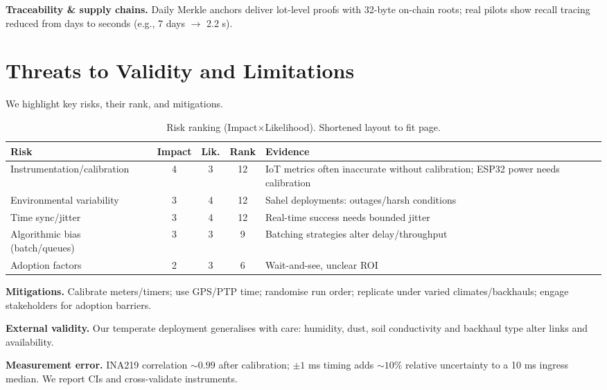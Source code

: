 \documentclass[12pt,onecolumn]{IEEEtran} %
\begin{document}
\textbf{Traceability \& supply chains.} Daily Merkle anchors deliver lot-level proofs with 32-byte on-chain roots; real pilots show recall tracing reduced from days to seconds (e.g., 7 days \(\to\) 2.2 s).

\section{Threats to Validity and Limitations}
\label{sec:threats}
We highlight key risks, their rank, and mitigations.

\begingroup
\setlength{\tabcolsep}{3pt}\footnotesize
\begin{table}[ht]
  \centering
  \caption{Risk ranking (Impact\(\times\)Likelihood). Shortened layout to fit page.}
  \label{tab:risk-table}
  \begin{tabularx}{\textwidth}{l c c c X}
    \toprule
    \textbf{Risk} & \textbf{Impact} & \textbf{Lik.} & \textbf{Rank} & \textbf{Evidence} \\
    \midrule
    Instrumentation/calibration & 4 & 3 & 12 & IoT metrics often inaccurate without calibration; ESP32 power needs calibration \\
    Environmental variability & 3 & 4 & 12 & Sahel deployments: outages/harsh conditions \\
    Time sync/jitter & 3 & 4 & 12 & Real-time success needs bounded jitter \\
    Algorithmic bias (batch/queues) & 3 & 3 & 9 & Batching strategies alter delay/throughput \\
    Adoption factors & 2 & 3 & 6 & Wait-and-see, unclear ROI \\
    \bottomrule
  \end{tabularx}
\end{table}
\endgroup

\textbf{Mitigations.} Calibrate meters/timers; use GPS/PTP time; randomise run order; replicate under varied climates/backhauls; engage stakeholders for adoption barriers.

\textbf{External validity.} Our temperate deployment generalises with care: humidity, dust, soil conductivity and backhaul type alter links and availability.

\textbf{Measurement error.} INA219 correlation \(\sim0.99\) after calibration; \(\pm1\) ms timing adds \(\sim10\%\) relative uncertainty to a 10 ms ingress median. We report CIs and cross-validate instruments.



% 

\clearpage

\end{document}
